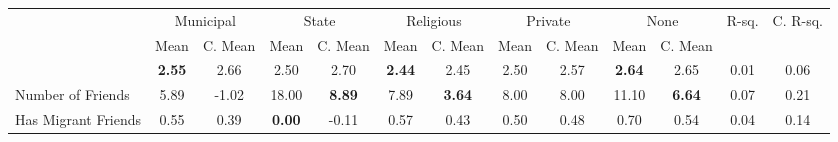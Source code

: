 \begin{tabular}{l c c c c c c c c c c c c}
\toprule
& \multicolumn{2}{c}{Municipal} & \multicolumn{2}{c}{State} & \multicolumn{2}{c}{Religious} & \multicolumn{2}{c}{Private} & \multicolumn{2}{c}{None} & R-sq. & C. R-sq. \\
& \scriptsize Mean & \scriptsize C. Mean & \scriptsize Mean & \scriptsize C. Mean & \scriptsize Mean & \scriptsize C. Mean & \scriptsize Mean & \scriptsize C. Mean & \scriptsize Mean & \scriptsize C. Mean & & \\
\midrule
& \textbf{     2.55} & 2.66 &      2.50 & 2.70 & \textbf{     2.44} & 2.45 &      2.50 & 2.57 & \textbf{     2.64} & 2.65 &      0.01 &      0.06 \\
Number of Friends &      5.89 & -1.02 &     18.00 & \textbf{     8.89} &      7.89 & \textbf{     3.64} &      8.00 & 8.00 &     11.10 & \textbf{     6.64} &      0.07 &      0.21 \\
Has Migrant Friends &      0.55 & 0.39 & \textbf{     0.00} & -0.11 &      0.57 & 0.43 &      0.50 & 0.48 &      0.70 & 0.54 &      0.04 &      0.14 \\
\bottomrule
\end{tabular}
